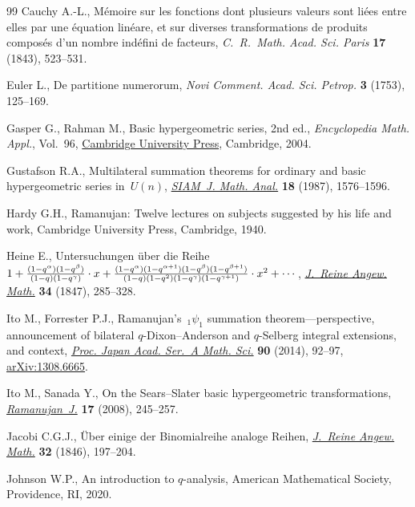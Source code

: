 \documentclass[10pt,a4paper]{amsart}
\numberwithin{equation}{section}
\begin{document}
\begin{thebibliography}{99}
Cauchy A.-L., M\'emoire sur les fonctions dont plusieurs valeurs sont li\'ees
 entre elles par une \'equation lin\'eare, et sur diverses transformations de
 produits composés d'un nombre ind\'efini de facteurs, \textit{C.~R.~Math.
 Acad. Sci. Paris} \textbf{17} (1843), 523--531.

Euler L., De partitione numerorum, \textit{Novi Comment. Acad. Sci. Petrop.}
 \textbf{3} (1753), 125--169.

Gasper G., Rahman M., Basic hypergeometric series, 2nd ed., \textit{Encyclopedia Math.
 Appl.}, Vol.~96,
 \href{https://doi.org/10.1017/CBO9780511526251}{Cambridge University Press},
 Cambridge, 2004.

Gustafson R.A., Multilateral summation theorems for ordinary and basic
 hypergeometric series in~{$U(n)$},
 \href{https://doi.org/10.1137/0518114}{\textit{SIAM~J. Math. Anal.}}
 \textbf{18} (1987), 1576--1596.

Hardy G.H., Ramanujan: {T}welve lectures on subjects suggested by his life and
 work, Cambridge University Press, Cambridge, 1940.

Heine E., Untersuchungen \"uber die {R}eihe $1+{(1-q^{\alpha})(1-q^{\beta})
 \over (1-q)(1-q^{\gamma})} \cdot x +
 {(1-q^{\alpha})(1-q^{\alpha+1})(1-q^{\beta})(1-q^{\beta+1}) \over
 (1-q)(1-q^2)(1-q^{\gamma})(1-q^{\gamma+1})} \cdot x^2 + \cdots$,
 \href{https://doi.org/10.1515/crll.1847.34.285}{\textit{J.~Reine Angew.
 Math.}} \textbf{34} (1847), 285--328.

Ito M., Forrester P.J., Ramanujan's~{${}_1\psi_1$} summation
 theorem---perspective, announcement of bilateral {$q$}-{D}ixon--{A}nderson
 and {$q$}-{S}elberg integral extensions, and context,
 \href{https://doi.org/10.3792/pjaa.90.92}{\textit{Proc. Japan Acad. Ser.~A
 Math. Sci.}} \textbf{90} (2014), 92--97,
 \href{http://arxiv.org/abs/1308.6665}{arXiv:1308.6665}.

Ito M., Sanada Y., On the {S}ears--{S}later basic hypergeometric
 transformations,
 \href{https://doi.org/10.1007/s11139-006-9012-6}{\textit{Ramanujan~J.}}
 \textbf{17} (2008), 245--257.

Jacobi C.G.J., \"Uber einige der {B}inomialreihe analoge {R}eihen,
 \href{https://doi.org/10.1515/crll.1846.32.197}{\textit{J.~Reine Angew.
 Math.}} \textbf{32} (1846), 197--204.

Johnson W.P., An introduction to {$q$}-analysis, American Mathematical Society,
 Providence, RI, 2020.


\end{thebibliography}
\end{document}
